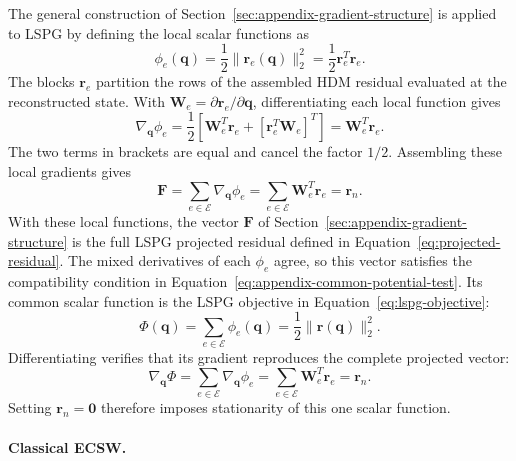 \documentclass[a4paper,12pt]{article}
\newcommand{\vect}[1]{\boldsymbol{#1}}
\newcommand{\matr}[1]{\boldsymbol{#1}}
\begin{document}
The general construction of Section~\ref{sec:appendix-gradient-structure} is applied to LSPG by defining the local scalar functions as
\[
 \phi_e(\vect{q})
 =\frac12\|\vect{r}_e(\vect{q})\|_2^2
 =\frac12\vect{r}_e^T\vect{r}_e.
\]
The blocks $\vect{r}_e$ partition the rows of the assembled HDM residual evaluated at the reconstructed state. With $\matr{W}_e=\partial\vect{r}_e/\partial\vect{q}$, differentiating each local function gives
\begin{equation}
 \nabla_{\vect{q}}\phi_e
 =\frac12\left[\matr{W}_e^T\vect{r}_e
                   +[\vect{r}_e^T\matr{W}_e]^T\right]
 =\matr{W}_e^T\vect{r}_e.
 \label{eq:appendix-local-objective}
\end{equation}
The two terms in brackets are equal and cancel the factor $1/2$. Assembling these local gradients gives
\[
 \vect{F}
 =\sum_{e\in\mathcal E}\nabla_{\vect{q}}\phi_e
 =\sum_{e\in\mathcal E}\matr{W}_e^T\vect{r}_e
 =\vect{r}_n.
\]
With these local functions, the vector $\vect{F}$ of Section~\ref{sec:appendix-gradient-structure} is the full LSPG projected residual defined in Equation~\eqref{eq:projected-residual}. The mixed derivatives of each $\phi_e$ agree, so this vector satisfies the compatibility condition in Equation~\eqref{eq:appendix-common-potential-test}. Its common scalar function is the LSPG objective in Equation~\eqref{eq:lspg-objective}:
\begin{equation}
 \Phi(\vect{q})
 =\sum_{e\in\mathcal E}\phi_e(\vect{q})
 =\frac12\|\vect{r}(\vect{q})\|_2^2.
 \label{eq:appendix-objective-partition}
\end{equation}
Differentiating verifies that its gradient reproduces the complete projected vector:
\begin{equation}
 \nabla_{\vect{q}}\Phi
 =\sum_{e\in\mathcal E}\nabla_{\vect{q}}\phi_e
 =\sum_{e\in\mathcal E}\matr{W}_e^T\vect{r}_e
 =\vect{r}_n.
 \label{eq:appendix-full-gradient}
\end{equation}
Setting $\vect{r}_n=\vect{0}$ therefore imposes stationarity of this one scalar function.

\paragraph{Classical ECSW.}
\label{sec:appendix-classical-objective}
\end{document}
